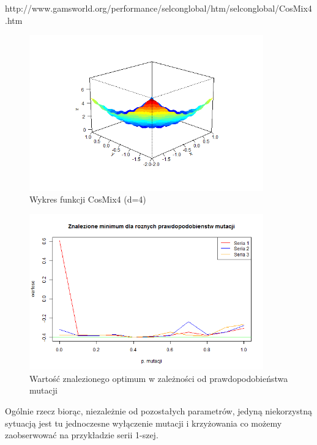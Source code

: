 \documentclass[11pt, a4paper]{article}
\newcommand{\fbi}{\leavevmode{\parindent=1em\indent}}
\begin{document}
http://www.gamsworld.org/performance/selconglobal/htm/selconglobal/CosMix4.htm

\begin{figure}[H]
	\begin{center}
		\includegraphics[width=0.9\textwidth]{./assets/CosMix41.png} %
		\caption{Wykres funkcji CosMix4 (d=4)}
		\label{fig:cosmix41}
	\end{center}
\end{figure}

\begin{figure}[H]
	\begin{center}
		\includegraphics[width=0.9\textwidth]{./assets/CosMix42.png} %
		\caption{Wartość znalezionego optimum w zależności od prawdopodobieństwa mutacji}
		\label{fig:cosmix42}
	\end{center}
\end{figure}

\fbi
Ogólnie rzecz biorąc, niezależnie od pozostałych parametrów, jedyną niekorzystną sytuacją jest tu jednoczesne wyłączenie mutacji i krzyżowania co możemy zaobserwować na przykładzie serii 1-szej.
\end{document}
